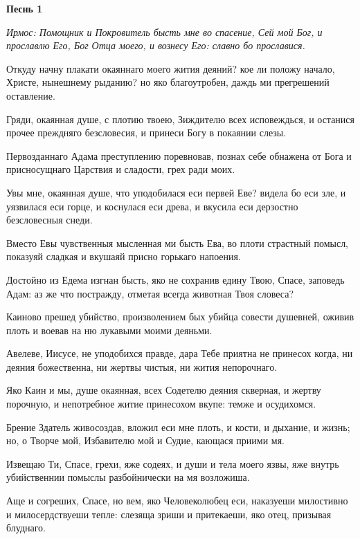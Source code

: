 \mychapterending

 
\bfseries Песнь 1\normalfont{}


\itshape Ирмос\normalfont{}: Помощник и Покровитель бысть мне во спасение, Сей мой Бог, и прославлю Его, Бог Отца моего, и вознесу Его: славно бо прославися.


Откуду начну плакати окаяннаго моего жития деяний? кое ли положу начало, Христе, нынешнему рыданию? но яко благоутробен, даждь ми прегрешений оставление.


Гряди, окаянная душе, с плотию твоею, Зиждителю всех исповеждься, и останися прочее преждняго безсловесия, и принеси Богу в покаянии слезы.


Первозданнаго Адама преступлению поревновав, познах себе обнажена от Бога и присносущнаго Царствия и сладости, грех ради моих.


Увы мне, окаянная душе, что уподобилася еси первей Еве? видела бо еси зле, и уязвилася еси горце, и коснулася еси древа, и вкусила еси дерзостно безсловесныя снеди.


Вместо Евы чувственныя мысленная ми бысть Ева, во плоти страстный помысл, показуяй сладкая и вкушаяй присно горькаго напоения.


Достойно из Едема изгнан бысть, яко не сохранив едину Твою, Спасе, заповедь Адам: аз же что постражду, отметая всегда животная Твоя словеса?


Каиново прешед убийство, произволением бых убийца совести душевней, оживив плоть и воевав на ню лукавыми моими деяньми.


Авелеве, Иисусе, не уподобихся правде, дара Тебе приятна не принесох когда, ни деяния божественна, ни жертвы чистыя, ни жития непорочнаго.


Яко Каин и мы, душе окаянная, всех Содетелю деяния скверная, и жертву порочную, и непотребное житие принесохом вкупе: темже и осудихомся.


Брение Здатель живосоздав, вложил еси мне плоть, и кости, и дыхание, и жизнь; но, о Творче мой, Избавителю мой и Судие, кающася приими мя.


Извещаю Ти, Спасе, грехи, яже содеях, и души и тела моего язвы, яже внутрь убийственнии помыслы разбойнически на мя возложиша.


Аще и согреших, Спасе, но вем, яко Человеколюбец еси, наказуеши милостивно и милосердствуеши тепле: слезяща зриши и притекаеши, яко отец, призывая блуднаго.


